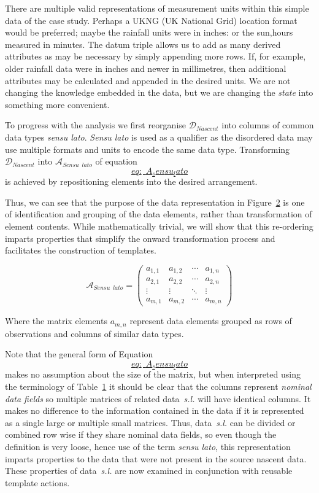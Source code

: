 \documentclass[
]{article}
\begin{document}
There are multiple valid representations of measurement units within
this simple data of the case study. Perhaps a UKNG (UK National Grid)
location format would be preferred; maybe the rainfall units were in
inches: or the sun,hours measured in minutes. The datum triple allows us
to add as many derived attributes as may be necessary by simply
appending more rows. If, for example, older rainfall data were in inches
and newer in millimetres, then additional attributes may be calculated
and appended in the desired units. We are not changing the knowledge
embedded in the data, but we are changing the \emph{state} into
something more convenient.

To progress with the analysis we first reorganise
\(\mathscr{D}_{Nascent}\) into columns of common data types \emph{sensu
lato}. \emph{Sensu lato} is used as a qualifier as the disordered data
may use multiple formats and units to encode the same data type.
Transforming \(\mathscr{D}_{Nascent}\) into
\(\mathscr{A}_{Sensu \enspace lato}\) of
equation~\protect\hyperlink{eq:_A_sensu_lato}{\[eq:\_A_sensu_lato\]} is
achieved by repositioning elements into the desired arrangement.

Thus, we can see that the purpose of the data representation in
Figure~\protect\hyperlink{Fig-theory-nascent-data}{2} is one of
identification and grouping of the data elements, rather than
transformation of element contents. While mathematically trivial, we
will show that this re-ordering imparts properties that simplify the
onward transformation process and facilitates the construction of
templates.

\[\label{eq:_A_sensu_lato}
    \mathscr{A}_{Sensu \enspace lato} =
    \begin{pmatrix}
        a_{1,1} & a_{1,2} & \cdots & a_{1,n} \\
        a_{2,1} & a_{2,2} & \cdots & a_{2,n} \\
        \vdots  & \vdots  & \ddots & \vdots  \\
        a_{m,1} & a_{m,2} & \cdots & a_{m,n} 
    \end{pmatrix}\]

Where the matrix elements \(a_{m,n}\) represent data elements grouped as
rows of observations and columns of similar data types.

Note that the general form of Equation
\protect\hyperlink{eq:_A_sensu_lato}{\[eq:\_A_sensu_lato\]} makes no
assumption about the size of the matrix, but when interpreted using the
terminology of Table~\protect\hyperlink{fig_terminology_introduction}{1}
it should be clear that the columns represent \emph{nominal data fields}
so multiple matrices of related data~\emph{s.l.} will have identical
columns. It makes no difference to the information contained in the data
if it is represented as a single large or multiple small matrices. Thus,
data~\emph{s.l.} can be divided or combined row wise if they share
nominal data fields, so even though the definition is very loose, hence
use of the term \emph{sensu lato}, this representation imparts
properties to the data that were not present in the source nascent data.
These properties of data~\emph{s.l.} are now examined in conjunction
with reusable template actions.
\end{document}

